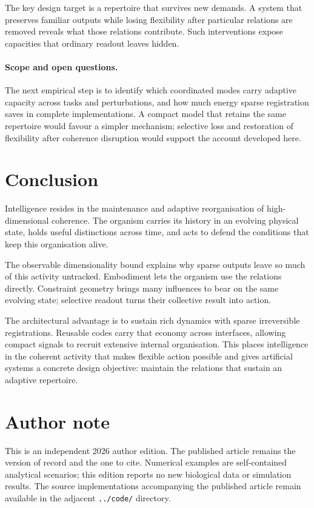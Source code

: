 \documentclass[11pt,a4paper]{article}
\begin{document}
The key design target is a repertoire that survives new demands. A system that preserves familiar outputs while losing flexibility after particular relations are removed reveals what those relations contribute. Such interventions expose capacities that ordinary readout leaves hidden.

\paragraph{Scope and open questions.}
The next empirical step is to identify which coordinated modes carry adaptive capacity across tasks and perturbations, and how much energy sparse registration saves in complete implementations. A compact model that retains the same repertoire would favour a simpler mechanism; selective loss and restoration of flexibility after coherence disruption would support the account developed here.

\section{Conclusion}

Intelligence resides in the maintenance and adaptive reorganisation of high-dimensional coherence. The organism carries its history in an evolving physical state, holds useful distinctions across time, and acts to defend the conditions that keep this organisation alive.

The observable dimensionality bound explains why sparse outputs leave so much of this activity untracked. Embodiment lets the organism use the relations directly. Constraint geometry brings many influences to bear on the same evolving state; selective readout turns their collective result into action.

The architectural advantage is to sustain rich dynamics with sparse irreversible registrations. Reusable codes carry that economy across interfaces, allowing compact signals to recruit extensive internal organisation. This places intelligence in the coherent activity that makes flexible action possible and gives artificial systems a concrete design objective: maintain the relations that sustain an adaptive repertoire.

\section*{Author note}
This is an independent 2026 author edition. The published article remains the version of record and the one to cite. Numerical examples are self-contained analytical scenarios; this edition reports no new biological data or simulation results. The source implementations accompanying the published article remain available in the adjacent \texttt{../code/} directory.
\end{document}
